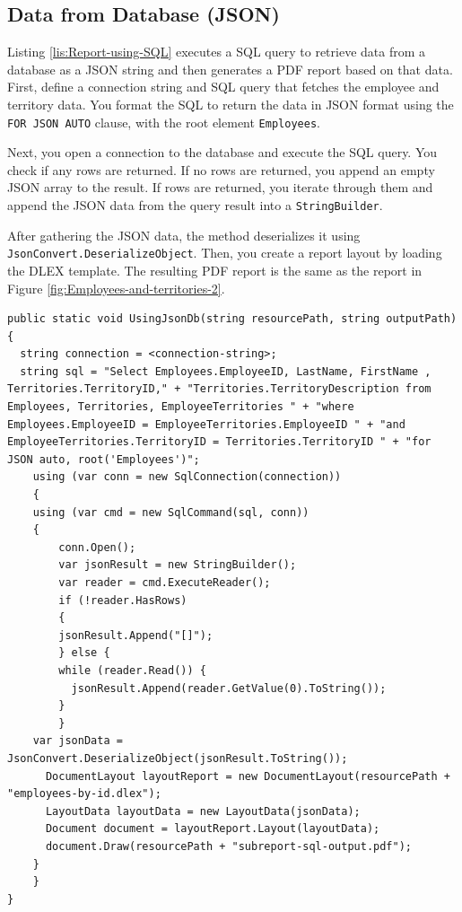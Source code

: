 \documentclass[american]{tufte-book}
\numberwithin{equation}{section}
\numberwithin{figure}{section}
\begin{document}
{{\subsection{Data from Database (JSON)}

Listing \ref{lis:Report-using-SQL} executes a SQL query to retrieve
data from a database as a JSON string and then generates a PDF report
based on that data. First, define a connection string and SQL query
that fetches the employee and territory data. You format the SQL to
return the data in JSON format using the \texttt{FOR JSON AUTO} clause,
with the root element \texttt{Employees}.

Next, you open a connection to the database and execute the SQL query.
You check if any rows are returned. If no rows are returned, you append
an empty JSON array to the result. If rows are returned, you iterate
through them and append the JSON data from the query result into a
\texttt{StringBuilder}.

After gathering the JSON data, the method deserializes it using \texttt{JsonConvert\allowbreak.DeserializeObject}. Then, you create
a report layout by loading the DLEX template. The resulting PDF report
is the same as the report in Figure \ref{fig:Employees-and-territories-2}.

\bgroup{}
\begin{lstlisting}[caption={Report using SQL and JSON.},label={lis:Report-using-SQL},basicstyle={\footnotesize\ttfamily},breaklines=true]
public static void UsingJsonDb(string resourcePath, string outputPath)
{
  string connection = <connection-string>;
  string sql = "Select Employees.EmployeeID, LastName, FirstName , Territories.TerritoryID," + "Territories.TerritoryDescription from Employees, Territories, EmployeeTerritories " + "where Employees.EmployeeID = EmployeeTerritories.EmployeeID " + "and EmployeeTerritories.TerritoryID = Territories.TerritoryID " + "for JSON auto, root('Employees')";
    using (var conn = new SqlConnection(connection))
    {
    using (var cmd = new SqlCommand(sql, conn))
    {
        conn.Open();
        var jsonResult = new StringBuilder();
        var reader = cmd.ExecuteReader();
        if (!reader.HasRows)
        {
        jsonResult.Append("[]");
        } else {
        while (reader.Read()) {
          jsonResult.Append(reader.GetValue(0).ToString());
        }
        }
    var jsonData = JsonConvert.DeserializeObject(jsonResult.ToString());
      DocumentLayout layoutReport = new DocumentLayout(resourcePath + "employees-by-id.dlex");
      LayoutData layoutData = new LayoutData(jsonData);
      Document document = layoutReport.Layout(layoutData);
      document.Draw(resourcePath + "subreport-sql-output.pdf");
    }
    }
}
\end{lstlisting}
\leavevmode\egroup


}}
\end{document}
